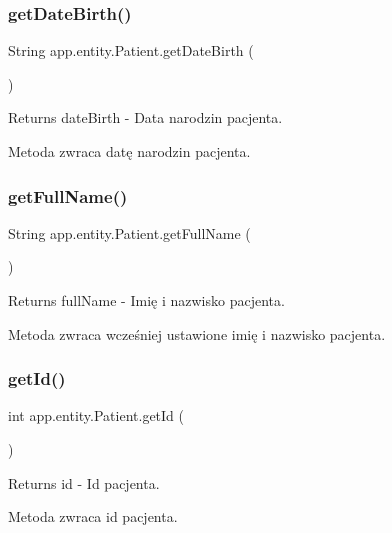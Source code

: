 \subsubsection{\texorpdfstring{getDateBirth()}{getDateBirth()}}
{\footnotesize\ttfamily String app.\+entity.\+Patient.\+get\+Date\+Birth (\begin{DoxyParamCaption}{ }\end{DoxyParamCaption})}

\begin{DoxyReturn}{Returns}
date\+Birth -\/ Data narodzin pacjenta.
\end{DoxyReturn}
Metoda zwraca datę narodzin pacjenta. \mbox{\label{classapp_1_1entity_1_1_patient_aef4a029a9b1483e3fc88acb2784b3722}} 
\subsubsection{\texorpdfstring{getFullName()}{getFullName()}}
{\footnotesize\ttfamily String app.\+entity.\+Patient.\+get\+Full\+Name (\begin{DoxyParamCaption}{ }\end{DoxyParamCaption})}

\begin{DoxyReturn}{Returns}
full\+Name -\/ Imię i nazwisko pacjenta.
\end{DoxyReturn}
Metoda zwraca wcześniej ustawione imię i nazwisko pacjenta. \mbox{\label{classapp_1_1entity_1_1_patient_ae83007344218065de629911933089412}} 
\subsubsection{\texorpdfstring{getId()}{getId()}}
{\footnotesize\ttfamily int app.\+entity.\+Patient.\+get\+Id (\begin{DoxyParamCaption}{ }\end{DoxyParamCaption})}

\begin{DoxyReturn}{Returns}
id -\/ Id pacjenta.
\end{DoxyReturn}
Metoda zwraca id pacjenta. \mbox{\label{classapp_1_1entity_1_1_patient_af65c436f6dba6b83159818012bbef22e}} 
